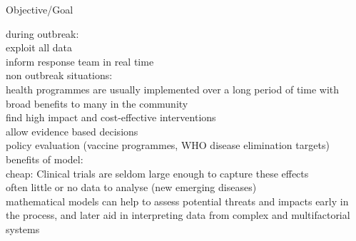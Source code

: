 \documentclass[table]{beamer}\usepackage[]{graphicx}\usepackage[]{color}
\begin{document}
\begin{frame}[fragile]{Objective/Goal}

during outbreak: \\
exploit all data \\
inform response team in real time \\

non outbreak situations: \\
health programmes are usually implemented over a long period of time with broad benefits to many in the community \\
find high impact and cost-effective interventions \\
allow evidence based decisions \\
policy evaluation (vaccine programmes, WHO disease elimination targets) \\ %

benefits of model: \\
cheap: Clinical trials are seldom large enough to capture these effects \\
often little or no data to analyse (new emerging diseases)\\

mathematical models can help to assess potential threats and impacts early in the process, and later aid in interpreting data from complex and multifactorial systems


\end{frame}
\end{document}
